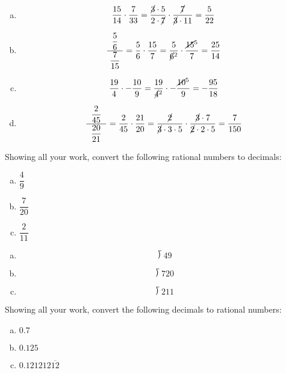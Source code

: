 \documentclass[11pt,letterpaper]{article}
\begin{document}
\sol
\begin{enumerate}[(a)]
\item 
	\[
	\dfrac{15}{14} \cdot \dfrac{7}{33}= \dfrac{\cancel{3} \cdot 5}{2 \cdot \cancel{7}} \cdot \dfrac{\cancel{7}}{\cancel{3} \cdot 11}= \dfrac{5}{22}
	\] \pspace

\item 
	\[
	\dfrac{\;\;\dfrac{5}{6}\;\;}{\dfrac{7}{15}}= \dfrac{5}{6} \cdot \dfrac{15}{7}= \dfrac{5}{\cancel{6}^2} \cdot \dfrac{\cancel{15}^5}{7}= \dfrac{25}{14}
	\] \pspace

\item 
	\[
	\dfrac{19}{4} \cdot -\dfrac{10}{9}= \dfrac{19}{\cancel{4}^2} \cdot -\dfrac{\cancel{10}^5}{9}= -\dfrac{95}{18}
	\] \pspace

\item 
	\[
	\dfrac{\;\;\dfrac{2}{45}\;\;}{\dfrac{20}{21}}= \dfrac{2}{45} \cdot \dfrac{21}{20}= \dfrac{\cancel{2}}{\cancel{3} \cdot 3 \cdot 5} \cdot \dfrac{\cancel{3} \cdot 7}{\cancel{2} \cdot 2 \cdot 5}= \dfrac{7}{150}
	\]
\end{enumerate} 



\newpage



 Showing all your work, convert the following rational numbers to decimals:
	\begin{enumerate}[(a)]
	\item $\dfrac{4}{9}$
	\item $\dfrac{7}{20}$
	\item $\dfrac{2}{11}$
	\end{enumerate} \pspace

\sol
\begin{enumerate}[(a)]
\item 
	\[
	\longdivision{4}{9}
	\] \pspace

\item 
	\[
	\longdivision{7}{20}
	\] \pspace

\item 
	\[
	\longdivision{2}{11}
	\] 
\end{enumerate}



\newpage



 Showing all your work, convert the following decimals to rational numbers:
	\begin{enumerate}[(a)]
	\item $0.7$
	\item $0.125$
	\item $0.121212\overline{12}$
	\end{enumerate} \pspace
\end{document}
